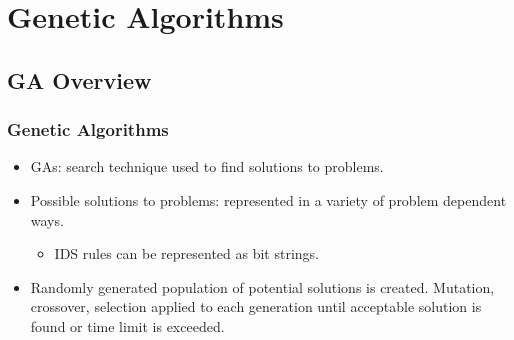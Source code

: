 \documentclass{beamer}
\newcommand{\linespace}{\vskip 0.25cm}
\begin{document}
\section[Genetic Algorithms]{Genetic Algorithms}
\subsection{GA Overview}
\begin{frame}
  \frametitle{Genetic Algorithms}
	\begin{itemize}
		\item GAs: search technique used to find solutions to problems.
        \item Possible solutions to problems: represented in a variety of problem dependent ways.
        
        \begin{itemize}
        	\item IDS rules can be represented as bit strings.
        \end{itemize}
        
        \linespace
        \item Randomly generated population of potential solutions is created. Mutation, crossover, selection applied to each generation until acceptable solution is found or time limit is exceeded.
	\end{itemize}
\end{frame}
\end{document}

